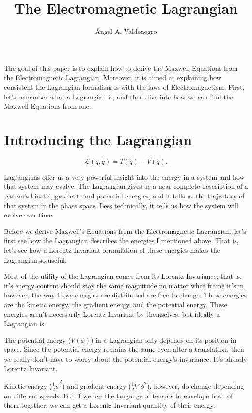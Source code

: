 \documentclass{article}
\title{The Electromagnetic Lagrangian}
\author{\'{A}ngel A. Valdenegro}
\newcommand{\lagr}{\mathcal{L}}
\begin{document}
\maketitle

The goal of this paper is to explain how to derive the Maxwell Equations from the Electromagnetic Lagrangian. Moreover, it is aimed at explaining how consistent the Lagrangian formalism is with the laws of Electromagnetism. First, let's remember what a Lagrangian is, and then dive into how we can find the Maxwell Equations from one.

\section{Introducing the Lagrangian}

\[
    \lagr(q,\dot{q}) = T(\dot{q}) - V(q)
.\] 

 Lagrangians offer us a very powerful insight into the energy in a system and how that system may evolve. The Lagrangian gives us a near complete description of a system's kinetic, gradient, and potential energies, and it tells us the trajectory of that system in the phase space. Less technically, it tells us how the system will evolve over time.

Before we derive Maxwell's Equations from the Electromagnetic Lagrangian, let's first see how the Lagrangian describes the energies I mentioned above. That is, let's see how a Lorentz Invariant formulation of these energies makes the Lagrangian so useful.

Most of the utility of the Lagrangian comes from its Lorentz Invariance; that is, it's energy content should stay the same magnitude no matter what frame it's in, however, the way those energies are distributed are free to change. These energies are the kinetic energy, the gradient energy, and the potential energy. These energies aren't necessarily Lorentz Invariant by themselves, but ideally a Lagrangian is.

The potential energy ($V(\phi)$) in a Lagrangian only depends on its position in space. Since the potential energy remains the same even after a translation, then we really don't have to worry about the potential energy's invariance. It's already Lorentz Invariant.


Kinetic energy ($\frac{1}{2} \dot{\phi}^2$) and gradient energy ($\frac{1}{2} \nabla\phi ^2$), however, do change depending on different speeds. But if we use the language of tensors to envelope both of them together, we can get a Lorentz Invariant quantity of their energy.
    
\end{document}
